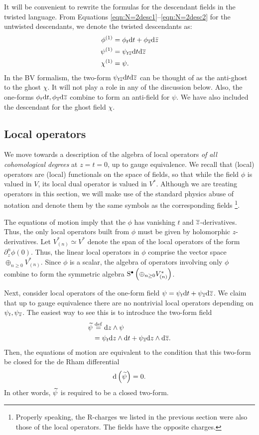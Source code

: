 \documentclass[11pt]{amsart}
\begin{document}
It will be convenient to rewrite the formulas for the descendant fields in the twisted language. 
From Equations \eqref{eqn:N=2desc1}--\eqref{eqn:N=2desc2} for the untwisted descendants, we denote the twisted descendants as:
\begin{align}
\label{eqn:N=2desc1tw}
\phi^{(1)} &= \phi_t {\rm d} t + \phi_{{\overline{z}}} {\rm d} \bar{z} \\
\label{eqn:N=2desc2tw}
\psi^{(1)} &= \psi_{t {\overline{z}}} {\rm d} t {\rm d} {\overline{z}}  \\
\label{eqn:N=2desc3tw} 
\chi^{(1)} &= \psi .
\end{align}
In the BV formalism, the two-form $\psi_{t {\overline{z}}} {\rm d} t {\rm d} {\overline{z}}$ can be thought of as the anti-ghost to the ghost $\chi$. 
It will not play a role in any of the discussion below. 
Also, the one-forms $\phi_t {\rm d} t, \phi_{{\overline{z}}} {\rm d} {\overline{z}}$ combine to form an anti-field for $\psi$. 
We have also included the descendant for the ghost field $\chi$.
\subsection{Local operators}

We move towards a description of the algebra of local operators \textit{of all cohomological degrees} at $z = t = 0$, up to gauge equivalence. 
We recall that (local) operators are (local) functionals on the space of fields, so that while the field $\phi$ is valued in $V$, its local dual operator is valued in $V^*$. Although we are treating operators in this section, we will make use of the standard physics abuse of notation and denote them by the same symbols as the corresponding fields \footnote{Properly speaking, the R-charges we listed in the previous section were also those of the local operators. The fields have the opposite charges.}. 

The equations of motion imply that the $\phi$ has vanishing $t$ and ${\overline{z}}$-derivatives. 
Thus, the only local operators built from $\phi$ must be given by holomorphic $z$-derivatives. 
Let $V^*_{(n)} \simeq V^*$ denote the span of the local operators of the form $\partial_z^n \phi(0)$.
Thus, the linear local operators in $\phi$ comprise the vector space $\oplus_{n \geq 0} V_{(n)}^*$.
Since $\phi$ is a scalar, the algebra of operators involving only $\phi$ combine to form the symmetric algebra ${\rm S}^\bullet \left(\oplus_{n \geq 0} V^*_{(n)}\right)$.

Next, consider local operators of the one-form field $\psi = \psi_t {\rm d} t + \psi_{\overline{z}} {\rm d} {\overline{z}}$. 
We claim that up to gauge equivalence there are no nontrivial local operators depending on $\psi_t, \psi_{\overline{z}}$.  
The easiest way to see this is to introduce the two-form field
\begin{align*}
\widetilde \psi & \overset{\rm def}{=} {\rm d} z \wedge \psi \\ & = \psi_t {\rm d} z \wedge {\rm d} t + \psi_{\overline{z}} {\rm d} z \wedge {\rm d} {\overline{z}} .
\end{align*}
Then, the equations of motion are equivalent to the condition that this two-form be closed for the de Rham differential
\[
{\rm d} \left(\widetilde \psi\right) = 0 .
\]
In other words, $\widetilde \psi$ is required to be a closed two-form.
\end{document}
